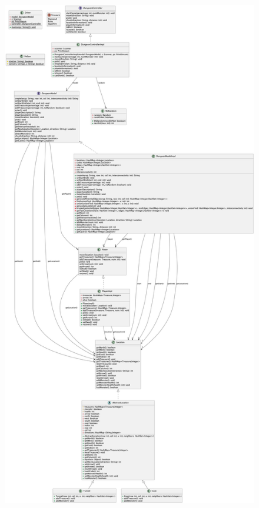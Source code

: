 \documentclass[12pt]{amsart}
\begin{document}
\begin{figure}[H] %
\centering %
\includegraphics[width=1\textwidth]{final_uml.png} %
\end{figure}
\end{document}
